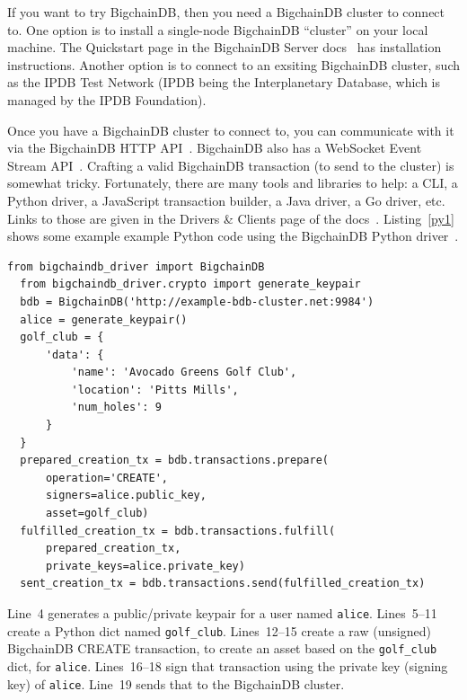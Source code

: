 \documentclass[a4paper]{article}
\begin{document}
If you want to try BigchainDB,
then you need a BigchainDB cluster to connect to.
One option is to install a single-node BigchainDB ``cluster''
on your local machine.
The Quickstart page
in the BigchainDB Server docs~\cite{bigchaindb_server_quickstart}
has installation instructions.
Another option is to connect to an exsiting
BigchainDB cluster, such as the IPDB Test Network
(IPDB being the Interplanetary Database,
which is managed by the IPDB Foundation\cite{ipdb_foundation_website}).

Once you have a BigchainDB cluster to connect to,
you can communicate with it via the BigchainDB HTTP API~\cite{bigchaindb_http_api}.
BigchainDB also has a WebSocket Event Stream API~\cite{bigchaindb_websocket_api}.
Crafting a valid BigchainDB transaction
(to send to the cluster) is somewhat tricky.
Fortunately, there are many tools and libraries to help:
a CLI, a Python driver, a JavaScript transaction builder, a Java driver, a Go driver, etc.
Links to those are given in the Drivers \& Clients page of the docs~\cite{bigchaindb_drivers_clients}.
Listing~\ref{py1} shows some example example Python code
using the BigchainDB Python driver~\cite{bigchaindb_python_driver}.


\begin{minipage}{\linewidth}
  \begin{lstlisting}[caption={Example Code Using the Python Driver}, label={py1}, style=python]
  from bigchaindb_driver import BigchainDB
  from bigchaindb_driver.crypto import generate_keypair
  bdb = BigchainDB('http://example-bdb-cluster.net:9984')
  alice = generate_keypair()
  golf_club = {
      'data': {
          'name': 'Avocado Greens Golf Club',
          'location': 'Pitts Mills',
          'num_holes': 9
      }
  }
  prepared_creation_tx = bdb.transactions.prepare(
      operation='CREATE',
      signers=alice.public_key,
      asset=golf_club)
  fulfilled_creation_tx = bdb.transactions.fulfill(
      prepared_creation_tx,
      private_keys=alice.private_key)
  sent_creation_tx = bdb.transactions.send(fulfilled_creation_tx)\end{lstlisting}
\end{minipage}

\medskip

Line~4 generates a public/private keypair for a user named \texttt{alice}.
Lines~5--11 create a Python dict named \texttt{golf\_club}.
Lines~12--15 create a raw (unsigned) BigchainDB CREATE transaction,
to create an asset based on the \texttt{golf\_club} dict, for \texttt{alice}.
Lines~16--18 sign that transaction using the private key (signing key)
of \texttt{alice}. Line~19 sends that to the BigchainDB cluster.
\end{document}

